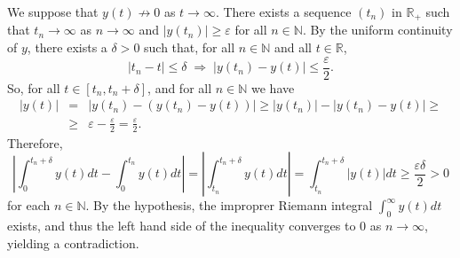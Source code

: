 \documentclass[12pt]{article}
\begin{document}
We suppose that $y(t) \not\rightarrow 0$ as  $t \rightarrow \infty$. There exists a sequence $(t_{n})$ in $\mathbb{R}_{+}$ such that $t_{n} \rightarrow \infty$ as $n \rightarrow \infty$ and $|y(t_{n})| \geq \varepsilon$ for all $n \in \mathbb{N}$. By the uniform continuity of $y$, there exists a $\delta > 0$ such that, for all $n \in \mathbb{N}$ and all $t \in \mathbb{R}$,
\[
|t_{n} - t| \leq \delta \; \Rightarrow \; |y(t_{n})  - y(t)| \leq \frac{\varepsilon}{2}.
\]
So, for all $t \in [t_{n}, t_{n}+\delta]$, and for all $n \in \mathbb{N}$ we have
\begin{eqnarray*}
|y(t)| & = & |y(t_{n}) - (y(t_{n})- y(t))| \geq |y(t_{n})| - |y(t_{n})- y(t)| \geq \\
& \geq & \varepsilon - \frac{\varepsilon}{2} = \frac{\varepsilon}{2}.
\end{eqnarray*}
Therefore,
\[
\left| \int_{0}^{t_{n}+\delta} y(t) dt - \int_{0}^{t_{n}} y(t) dt \right| = \left| \int_{t_{n}}^{t_{n}+\delta} y(t) dt \right| = \int_{t_{n}}^{t_{n}+\delta} |y(t)| dt \geq \frac{\varepsilon \delta}{2} > 0
\]
for each $n \in \mathbb{N}$. By the hypothesis, the improprer Riemann integral $\int_{0}^{\infty} y(t) dt$ exists, and thus the left hand side of the inequality converges to 0 as $n \rightarrow \infty$, yielding a contradiction.
\end{document}
